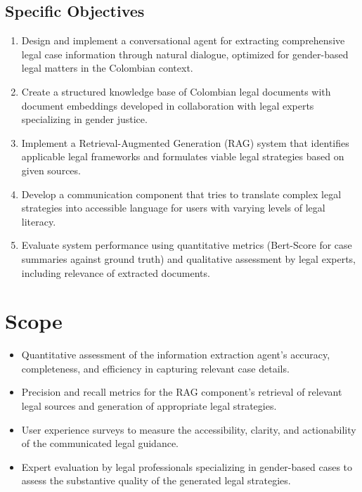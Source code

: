 \subsection{Specific Objectives}
\begin{enumerate}
    \item Design and implement a conversational agent for extracting comprehensive legal case information through natural dialogue, optimized for gender-based legal matters in the Colombian context.
    
    \item Create a structured knowledge base of Colombian legal documents with document embeddings developed in collaboration with legal experts specializing in gender justice.
    
    \item Implement a Retrieval-Augmented Generation (RAG) system that identifies applicable legal frameworks and formulates viable legal strategies based on given sources.
    
    \item Develop a communication component that tries to translate complex legal strategies into accessible language for users with varying levels of legal literacy.
    
    \item Evaluate system performance using quantitative metrics (Bert-Score for case summaries against ground truth) and qualitative assessment by legal experts, including relevance of extracted documents.
\end{enumerate}

\section{Scope}
\begin{itemize}
    \item Quantitative assessment of the information extraction agent's accuracy, completeness, and efficiency in capturing relevant case details.
    \item Precision and recall metrics for the RAG component's retrieval of relevant legal sources and generation of appropriate legal strategies.
    \item User experience surveys to measure the accessibility, clarity, and actionability of the communicated legal guidance.
    \item Expert evaluation by legal professionals specializing in gender-based cases to assess the substantive quality of the generated legal strategies.
\end{itemize}

